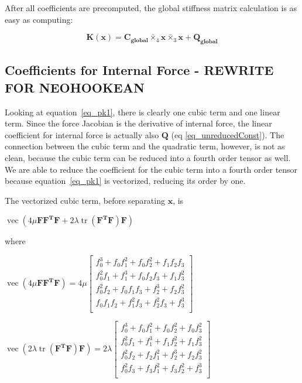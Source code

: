 \documentclass[twocolumn,10pt]{asme2ej}
\DeclareMathOperator{\vect}{vec}
\DeclareMathOperator{\tr}{tr}
\begin{document}
After all coefficients are precomputed, the global stiffness matrix calculation is as easy as computing:

\begin{equation}
  \bm{K}(\bm{x}) = \bm{C_{global}} \bar{\times}_4 \bm{x} \bar{\times}_3 \bm{x} + \bm{Q_{global}}
\end{equation}

\subsection{Coefficients for Internal Force  - REWRITE FOR NEOHOOKEAN}

Looking at equation~\ref{eq_pk1}, there is clearly one cubic term and one linear term. Since the force Jacobian is the derivative of internal force, the linear coefficient for internal force is actually also $\bm{Q}$ (eq \ref{eq_unreducedConst}). The connection between the cubic term and the quadratic term, however, is not as clean, because the cubic term can be reduced into a fourth order tensor as well. We are able to reduce the coefficient for the cubic term into a fourth order tensor because equation~\ref{eq_pk1} is vectorized, reducing its order by one.

The vectorized cubic term, before separating $\bm{x}$, is

\begin{center}
  $\vect \left( 4\mu\bm{FF^TF} + 2\lambda\tr\left(\bm{F^TF}\right)\bm{F}\right)$
\end{center}

where

\begin{center}
  $\vect \left( 4\mu\bm{FF^TF} \right) = 4\mu
  \begin{bmatrix}
    f_{0}^3 + f_0f_{1}^2 + f_0f_{2}^2 + f_1f_2f_3 \\
    f_{0}^2f_{1} + f_{1}^3 + f_0f_2f_3 + f_1f_{3}^2 \\
    f_{0}^2f_{2} + f_0f_1f_3 + f_{2}^3 + f_2f_{3}^2 \\
    f_0f_1f_2 + f_{1}^2f_3 + f_{2}^2f_3 + f_{3}^3 \\
    \end{bmatrix}$

    \bigskip
    $\vect \left( 2\lambda\tr\left(\bm{F^TF}\right)\bm{F} \right) = 2\lambda
    \begin{bmatrix}
      f_{0}^3 + f_0f_{1}^2 + f_0f_{2}^2 + f_0f_{3}^2 \\
      f_{0}^2f_1 + f_{1}^3 + f_1f_{2}^2 + f_1f_{3}^2 \\
      f_{0}^2f_2 + f_2f_{1}^2 + f_{2}^3 + f_2f_{3}^2 \\
      f_{0}^2f_3 + f_3f_{1}^2 + f_3f_{2}^2 + f_{3}^3\\
      \end{bmatrix}$
\end{center}
\end{document}
